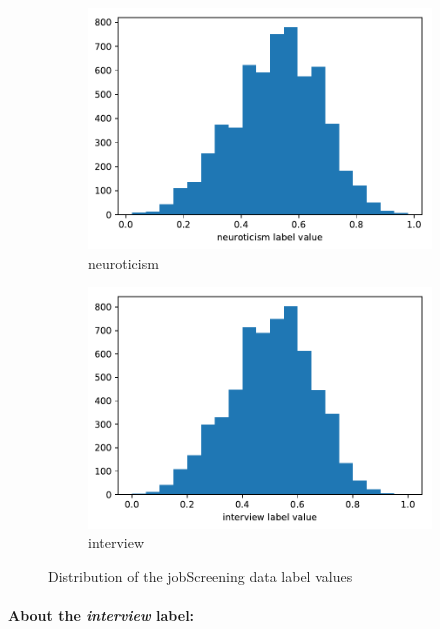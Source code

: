 \documentclass[12pt,a4paper]{report}
\begin{document}
\begin{figure}
\begin{subfigure}[b]{0.32\textwidth}
        \includegraphics[width=\textwidth]{imgs/neuroticism_label_value.pdf}
        \caption{neuroticism}
        \label{fig:neuroticism}
    \end{subfigure}
    \begin{subfigure}[b]{0.32\textwidth}
        \includegraphics[width=\textwidth]{imgs/interview_label_value.pdf}
        \caption{interview}
        \label{fig:interview}
    \end{subfigure}
    \caption{Distribution of the jobScreening data label values}\label{fig:jobscreeninglabels}
\end{figure}

\paragraph{About the \emph{interview} label:}
\end{document}
